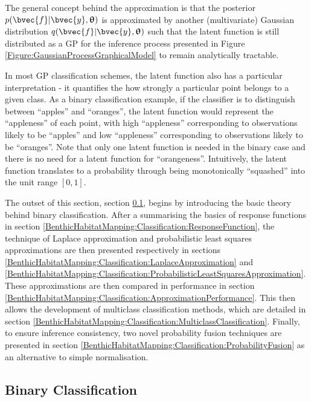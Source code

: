 		The general concept behind the approximation is that the posterior $p(\bvec{f} | \bvec{y}, \vec{\uptheta})$ is approximated by another (multivariate) Gaussian distribution $q(\bvec{f} | \bvec{y}, \vec{\uptheta})$ such that the latent function is still distributed as a GP for the inference process presented in Figure \ref{Figure:GaussianProcessGraphicalModel} to remain analytically tractable.
		
		In most GP classification schemes, the latent function also has a particular interpretation - it quantifies the how strongly a particular point belongs to a given class. As a binary classification example, if the classifier is to distinguish between ``apples'' and ``oranges'', the latent function would represent the ``appleness'' of each point, with high ``appleness'' corresponding to observations likely to be ``apples'' and low ``appleness'' corresponding to observations likely to be ``oranges''. Note that only one latent function is needed in the binary case and there is no need for a latent function for ``orangeness''. Intuitively, the latent function translates to a probability through being monotonically ``squashed'' into the unit range $[0, 1]$.
		
		The outset of this section, section \ref{BenthicHabitatMapping:Classification:BinaryClassification}, begins by introducing the basic theory behind binary classification. After a summarising the basics of response functions in section \ref{BenthicHabitatMapping:Classification:ResponseFunction}, the technique of Laplace approximation and probabilistic least squares approximations are then presented respectively in sections \ref{BenthicHabitatMapping:Classification:LaplaceApproximation} and \ref{BenthicHabitatMapping:Classification:ProbabilisticLeastSquaresApproximation}. These approximations are then compared in performance in section \ref{BenthicHabitatMapping:Classification:ApproximationPerformance}. This then allows the development of multiclass classification methods, which are detailed in section \ref{BenthicHabitatMapping:Classification:MulticlassClassification}. Finally, to ensure inference consistency, two novel probability fusion techniques are presented in section \ref{BenthicHabitatMapping:Classification:ProbabilityFusion} as an alternative to simple normalisation.
		
		\subsection{Binary Classification}
		\label{BenthicHabitatMapping:Classification:BinaryClassification}
			
